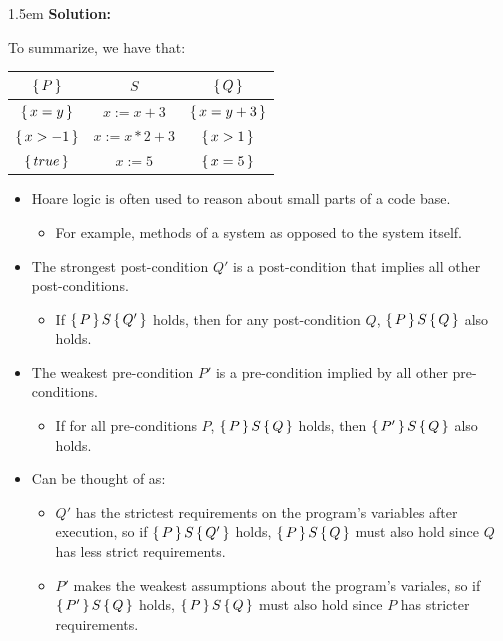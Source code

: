\documentclass{article}
\newcounter{example}
\newenvironment{solution}{
	\vspace{.5em}
	\par
	\begin{adjustwidth}{1.5em}{}
	\textbf{{Solution:}}
	\par
	\vspace{.5em}
}{
	\vspace{1em}
	\end{adjustwidth}
}
\begin{document}
\begin{solution}
	To summarize, we have that:

	\begin{center}
		\renewcommand{\arraystretch}{1.5}
		\begin{tabular}{| c | c | c |}
			\hline
			$\set{P}$ & $S$ & $\set{Q}$ \\[0.5em]
			\hline
			\makebox[0pt][r]{(a)\hspace{1.4em}}$\set{x = y}$ & $x := x + 3$ & $\set{x = y + 3}$ \\[0.5em]
			\hline
			\makebox[0pt][r]{(b)\hspace{1.05em}}$\set{x > -1}$ & $x := x * 2 + 3$ & $\set{x > 1}$ \\[0.5em]
			\hline
			\makebox[0pt][r]{(c)\hspace{1.75em}}$\set{true}$ & $x := 5$ & $\set{x = 5}$ \\[0.5em]
			\hline
		\end{tabular}
	\end{center}

\end{solution}

\begin{itemize}
	\item Hoare logic is often used to reason about small parts of a code base.
	\begin{itemize}
		\item For example, methods of a system as opposed to the system itself.
	\end{itemize}
	\item The strongest post-condition $Q'$ is a post-condition that implies all other post-conditions.
	\begin{itemize}
		\item If $\set{P}S\set{Q'}$ holds, then for any post-condition $Q$, $\set{P}S\set{Q}$ also holds.
	\end{itemize}
	\item The weakest pre-condition $P'$ is a pre-condition implied by all other pre-conditions.
	\begin{itemize}
		\item If for all pre-conditions $P$, $\set{P}S\set{Q}$ holds, then $\set{P'}S\set{Q}$ also holds.
	\end{itemize}
	\item Can be thought of as:
	\begin{itemize}
		\item $Q'$ has the strictest requirements on the program's variables after execution, so if $\set{P}S\set{Q'}$ holds, $\set{P}S\set{Q}$ must also hold since $Q$ has less strict requirements.
		\item $P'$ makes the weakest assumptions about the program's variales, so if $\set{P'}S\set{Q}$ holds, $\set{P}S\set{Q}$ must also hold since $P$ has stricter requirements.
	\end{itemize}
\end{itemize}

\ifdefined\iscombined
	\newpage
\else
	
\end{document}
